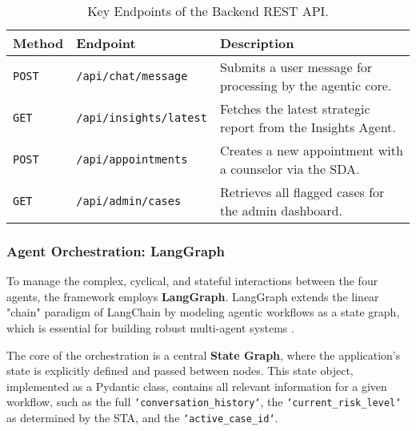 \begin{table}[h]
    \centering
    \caption{Key Endpoints of the Backend REST API.}
    \label{tab:api_endpoints}
    \begin{tabular}{lll}
        \toprule
        \textbf{Method} & \textbf{Endpoint} & \textbf{Description} \\
        \midrule
        \texttt{POST} & \texttt{/api/chat/message} & Submits a user message for processing by the agentic core. \\
        \texttt{GET} & \texttt{/api/insights/latest} & Fetches the latest strategic report from the Insights Agent. \\
        \texttt{POST} & \texttt{/api/appointments} & Creates a new appointment with a counselor via the SDA. \\
        \texttt{GET} & \texttt{/api/admin/cases} & Retrieves all flagged cases for the admin dashboard. \\
        \bottomrule
    \end{tabular}
\end{table}

\subsubsection{Agent Orchestration: LangGraph}

To manage the complex, cyclical, and stateful interactions between the four agents, the framework employs \textbf{LangGraph}. LangGraph extends the linear "chain" paradigm of LangChain by modeling agentic workflows as a state graph, which is essential for building robust multi-agent systems \cite{FIND_CITATION_HERE}.

The core of the orchestration is a central \textbf{State Graph}, where the application's state is explicitly defined and passed between nodes. This state object, implemented as a Pydantic class, contains all relevant information for a given workflow, such as the full \texttt{`conversation\_history`}, the \texttt{`current\_risk\_level`} as determined by the STA, and the \texttt{`active\_case\_id`}.

